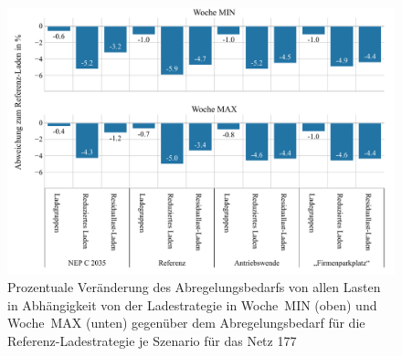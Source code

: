 \begin{figure}[H]
    \centering
    \includegraphics[width=\textwidth]{Bilder/177_cur_load_both_weeks}
    \caption{Prozentuale Veränderung des Abregelungsbedarfs von allen Lasten in Abhängigkeit von der Ladestrategie in Woche~MIN (oben) und Woche~MAX (unten) gegenüber dem Abregelungsbedarf für die Referenz-Ladestrategie je Szenario für das Netz \num{177}}\label{fig:177_cur_load_both_weeks}
\end{figure}